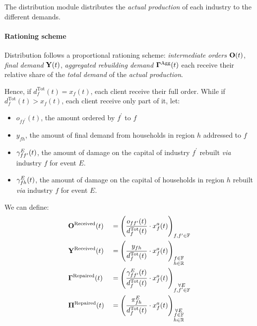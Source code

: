 The distribution module distributes the \emph{actual production} of each industry
to the different demands.

\paragraph{Rationing scheme}
\label{sec:rationing-scheme}

Distribution follows a proportional rationing scheme: \emph{intermediate orders} $\mathbf{O}(t)$, \emph{final demand}
$\mathbf{Y}(t)$, \emph{aggregated rebuilding demand} $\mathbf{\Gamma}^{\textrm{Agg}}(t)$ each
receive their relative share of the \emph{total demand} of the \emph{actual
  production}.

Hence, if \(d_f^{\textrm{Tot}}(t) = x_f(t)\), each client receive their full order. While if \(d_f^{\textrm{Tot}}(t) > x_f(t)\),
each client receive only part of it, let:
\begin{itemize}
\item $o_{ff^{\prime}}(t)$, the amount ordered by $f^{\prime}$ to $f$
\item $y_{fh}$, the amount of final demand from households in region $h$ addressed to $f$
\item $\gamma^{E}_{ff^{\prime}}(t)$, the amount of damage on the capital of industry
  $f^{\prime}$ rebuilt \emph{via} industry $f$ for event $E$.
\item $\gamma^{E}_{fh}(t)$, the amount of damage on the capital of
  households in region $h$ rebuilt \emph{via} industry $f$ for event $E$.
\end{itemize}

We can define:
\begin{alignat*}{4}
  &\mathbf{O}^{\textrm{Received}}(t) &&= \left ( \frac{o_{ff^{\prime}}(t)}{d^{\textrm{Tot}}_f(t)} \cdot x^a_f(t) \right )_{f,f^{\prime}\in \mathbb{F}}\\
  &\mathbf{Y}^{\textrm{Received}}(t) &&= \left (
                                  \frac{y_{fh}}{d^{\textrm{Tot}}_f(t)}\cdot
                                  x^a_f(t) \right )_{\substack{f\in \mathbb{F}\\h
  \in \mathbb{R}}}\\
  &\mathbf{\Gamma}^{\textrm{Repaired}}(t) &&= \left ( \frac{\gamma^{E}_{ff^{\prime}}(t)
                                     }{d^{\textrm{Tot}}_f(t)} \cdot x^a_f(t)
                                     \right )_{\substack{\forall E\\f,f^{\prime}\in \mathbb{F}}}\\
  &\bm{\Pi}^{\textrm{Repaired}}(t) &&= \left ( \frac{\pi^{E}_{fh}
                                      }{d^{\textrm{Tot}}_f(t)} \cdot x^a_f(t)
                                      \right )_{\substack{\forall E\\f\in \mathbb{F}\\h\in \mathbb{R}}}\\
\end{alignat*}


